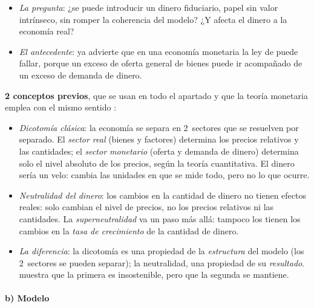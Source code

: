 \documentclass[11pt]{article}
\begin{document}
\begin{itemize}
\begin{itemize}
  \item \emph{No queda nada que determinar}: el sector real ya fija todos los precios relativos y las cantidades. El dinero solo podría determinar el nivel absoluto de los precios.
  \end{itemize}
\item \emph{La pregunta}: ¿se puede introducir un dinero fiduciario, papel sin valor intrínseco, sin romper la coherencia del modelo? ¿Y afecta el dinero a la economía real?
\item \emph{El antecedente}: \textcite{Mill1844Essays} ya advierte que en una economía monetaria la ley de  puede fallar, porque un exceso de oferta general de bienes puede ir acompañado de un exceso de demanda de dinero.
\end{itemize}

\begin{anotaciones}
\textbf{2 conceptos previos}, que se usan en todo el apartado y que la teoría monetaria emplea con el mismo sentido :
\begin{itemize}
\item \emph{Dicotomía clásica}: la economía se separa en 2~sectores que se resuelven por separado. El \emph{sector real} (bienes y factores) determina los precios relativos y las cantidades; el \emph{sector monetario} (oferta y demanda de dinero) determina solo el nivel absoluto de los precios, según la teoría cuantitativa. El dinero sería un velo: cambia las unidades en que se mide todo, pero no lo que ocurre.
\item \emph{Neutralidad del dinero}: los cambios en la cantidad de dinero no tienen efectos reales: solo cambian el nivel de precios, no los precios relativos ni las cantidades. La \emph{superneutralidad} va un paso más allá: tampoco los tienen los cambios en la \emph{tasa de crecimiento} de la cantidad de dinero.
\item \emph{La diferencia}: la dicotomía es una propiedad de la \emph{estructura} del modelo (los 2~sectores se pueden separar); la neutralidad, una propiedad de su \emph{resultado}.  muestra que la primera es insostenible, pero que la segunda se mantiene.
\end{itemize}
\end{anotaciones}

\paragraph{b) Modelo}
\end{document}
